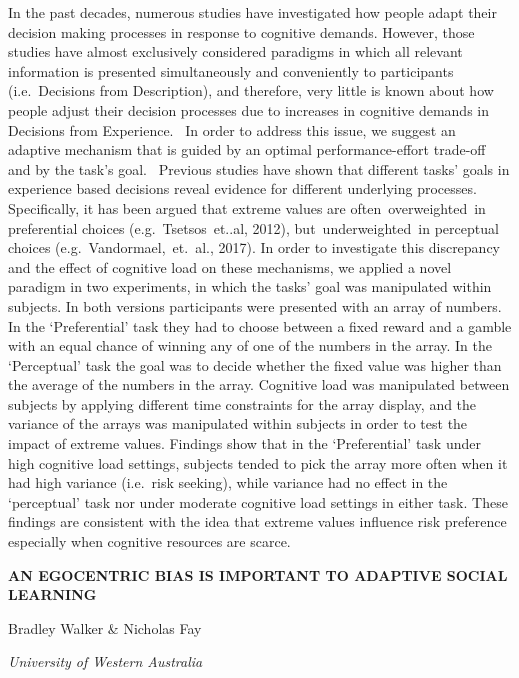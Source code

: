 \documentclass[]{article}
\begin{document}
In the past decades, numerous studies have investigated how people adapt
their decision making processes in response to cognitive demands.
However, those studies have almost exclusively considered paradigms in
which all relevant information is presented simultaneously and
conveniently to participants (i.e.~Decisions from Description), and
therefore, very little is known about how people adjust their decision
processes due to increases in cognitive demands in Decisions from
Experience.~ In order to address this issue, we suggest an adaptive
mechanism that is guided by an optimal performance-effort trade-off and
by the task's goal.~ Previous studies have shown that different tasks'
goals in experience based decisions reveal evidence for different
underlying processes. Specifically, it has been argued that extreme
values are often~overweighted~in preferential choices
(e.g.~Tsetsos~et..al, 2012), but~underweighted~in perceptual choices
(e.g.~Vandormael,~et.~al., 2017). In order to investigate this
discrepancy and the effect of cognitive load on these mechanisms, we
applied a novel paradigm in two experiments, in which the tasks' goal
was manipulated within subjects. In both versions participants were
presented with an array of numbers. In the `Preferential' task they had
to choose between a fixed reward and a gamble with an equal chance of
winning any of one of the numbers in the array. In the `Perceptual' task
the goal was to decide whether the fixed value was higher than the
average of the numbers in the array. Cognitive load was manipulated
between subjects by applying different time constraints for the array
display, and the variance of the arrays was manipulated within subjects
in order to test the impact of extreme values. Findings show that in the
`Preferential' task under high cognitive load settings, subjects tended
to pick the array more often when it had high variance (i.e.~risk
seeking), while variance had no effect in the `perceptual' task nor
under moderate cognitive load settings in either task. These findings
are consistent with the idea that extreme values influence risk
preference especially when cognitive resources are scarce.

\textbf{AN EGOCENTRIC BIAS IS IMPORTANT TO ADAPTIVE SOCIAL LEARNING}

Bradley Walker \& Nicholas Fay

\emph{University of Western Australia}
\end{document}
